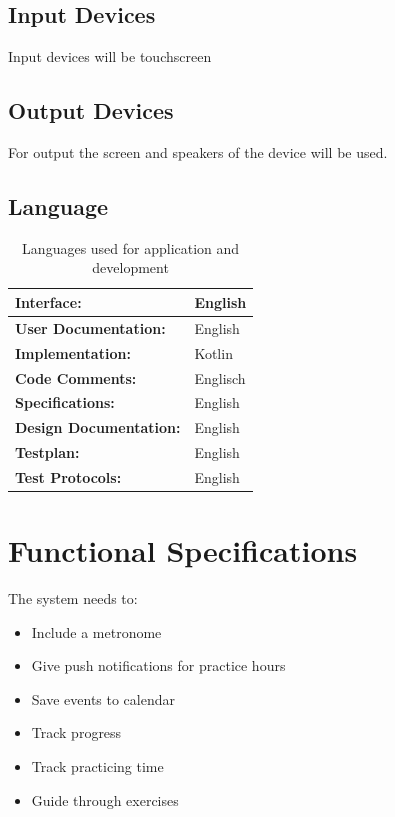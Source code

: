 \documentclass[12pt,a4paper]{report}
\begin{document}
\subsection{Input Devices}\label{c2-1-3}
Input devices will be touchscreen
\subsection{Output Devices}\label{c2-1-4}
For output the screen and speakers of the device will be used.

\subsection{Language}\label{c2-1-5}
\begin{table}[htp]
\caption{Languages used for application and development}\label{Tab-01}
\begin{tabular}{ll}
  \hline
  \textbf{Interface:}             & English \\
  \hline
  \textbf{User Documentation:}    & English \\
  \hline
  \textbf{Implementation:}        & Kotlin \\
  \hline
  \textbf{Code Comments:}         & Englisch \\
  \hline
  \textbf{Specifications:}        & English \\
  \hline
  \textbf{Design Documentation:}  & English \\
  \hline
  \textbf{Testplan:}              & English \\
  \hline
  \textbf{Test Protocols:}        & English \\
  \hline
\end{tabular}
\end{table}


\section{Functional Specifications}
The system needs to:
\begin{itemize}
  \item Include a metronome
  \item Give push notifications for practice hours
  \item Save events to calendar
  \item Track progress
  \item Track practicing time
  \item Guide through exercises
\end{itemize}
\end{document}
